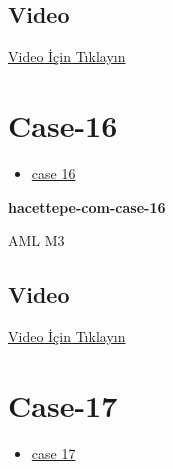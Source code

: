 \documentclass[
  letterpaper,
  DIV=11,
  numbers=noendperiod]{scrreprt}
\providecommand{\tightlist}{%
  \setlength{\itemsep}{0pt}\setlength{\parskip}{0pt}}\usepackage{longtable,booktabs,array}
\begin{document}
\hypertarget{video-13}{%
\subsection{Video}\label{video-13}}

\href{https://www.youtube.com/watch?v=3lmx9hYGcG8}{Video İçin Tıklayın}

\hypertarget{sec-hacettepe-case-of-the-month-case-16}{%
\section{Case-16}\label{sec-hacettepe-case-of-the-month-case-16}}

\begin{itemize}
\tightlist
\item
  \href{https://www.youtube.com/watch?v=Tkempcd59I0\&ab_channel=KemalKosemehmetoglu}{case
  16}
\end{itemize}

\textbf{hacettepe-com-case-16}

\begin{tcolorbox}[enhanced jigsaw, left=2mm, toprule=.15mm, rightrule=.15mm, bottomrule=.15mm, leftrule=.75mm, colback=white, colframe=quarto-callout-tip-color-frame, toptitle=1mm, breakable, titlerule=0mm, colbacktitle=quarto-callout-tip-color!10!white, bottomtitle=1mm, title=\textcolor{quarto-callout-tip-color}{\faLightbulb}\hspace{0.5em}{Tanı}, arc=.35mm, opacitybacktitle=0.6, opacityback=0, coltitle=black]

AML M3

\end{tcolorbox}

\hypertarget{video-14}{%
\subsection{Video}\label{video-14}}

\href{https://www.youtube.com/watch?v=Tkempcd59I0}{Video İçin Tıklayın}

\hypertarget{sec-hacettepe-case-of-the-month-case-17}{%
\section{Case-17}\label{sec-hacettepe-case-of-the-month-case-17}}

\begin{itemize}
\tightlist
\item
  \href{https://www.youtube.com/watch?v=zlewGuN0BBY\&ab_channel=KemalKosemehmetoglu}{case
  17}
\end{itemize}
\end{document}
